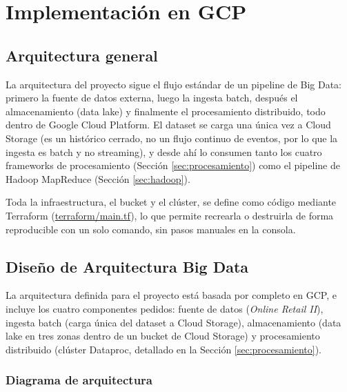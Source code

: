 \section{Implementación en GCP}
\label{sec:gcp}

\subsection{Arquitectura general}

La arquitectura del proyecto sigue el flujo estándar de un pipeline de Big Data: primero la fuente de datos externa, luego la ingesta batch, después el almacenamiento (data lake) y finalmente el procesamiento distribuido, todo dentro de Google Cloud Platform. El dataset se carga una única vez a Cloud Storage (es un histórico cerrado, no un flujo continuo de eventos, por lo que la ingesta es batch y no streaming), y desde ahí lo consumen tanto los cuatro frameworks de procesamiento (Sección \ref{sec:procesamiento}) como el pipeline de Hadoop MapReduce (Sección \ref{sec:hadoop}).

Toda la infraestructura, el bucket y el clúster, se define como código mediante Terraform (\url{terraform/main.tf}), lo que permite recrearla o destruirla de forma reproducible con un solo comando, sin pasos manuales en la consola.

\subsection{Diseño de Arquitectura Big Data}

La arquitectura definida para el proyecto está basada por completo en GCP, e incluye los cuatro componentes pedidos: fuente de datos (\emph{Online Retail II}), ingesta batch (carga única del dataset a Cloud Storage), almacenamiento (data lake en tres zonas dentro de un bucket de Cloud Storage) y procesamiento distribuido (clúster Dataproc, detallado en la Sección \ref{sec:procesamiento}).

\subsubsection*{Diagrama de arquitectura}

